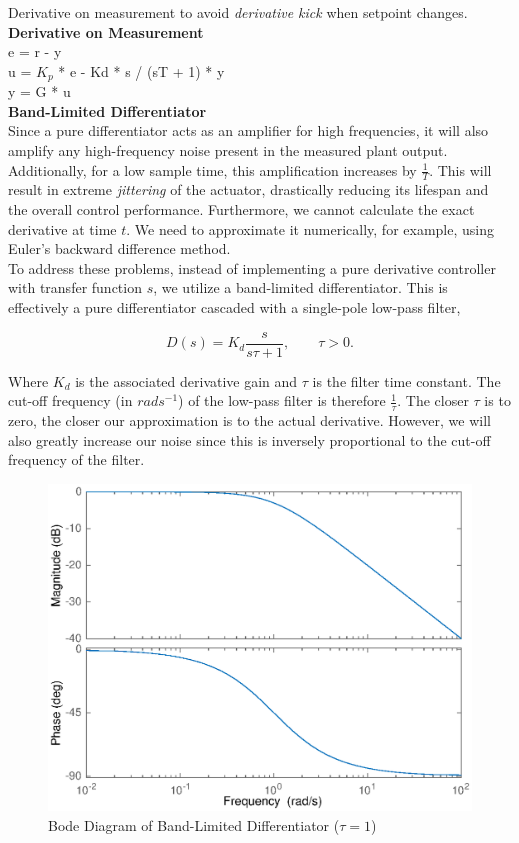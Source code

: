 \documentclass[a4paper]{article}
\begin{document}
Derivative on measurement to avoid \textit{derivative kick} when setpoint changes. \\

\textbf{Derivative on Measurement} \\
e = r - y \\
u = $K_p$ * e - Kd * s / (sT + 1) * y \\
y = G * u \\

\textbf{Band-Limited Differentiator} \\
Since a pure differentiator acts as an amplifier for high frequencies, it will also amplify any high-frequency noise present in the measured plant output. Additionally, for a low sample time, this amplification increases by $\frac{1}{T}$. This will result in extreme \textit{jittering} of the actuator, drastically reducing its lifespan and the overall control performance. Furthermore, we cannot calculate the exact derivative at time $t$. We need to approximate it numerically, for example, using Euler's backward difference method. \\
To address these problems, instead of implementing a pure derivative controller with transfer function $s$, we utilize a band-limited differentiator. This is effectively a pure differentiator cascaded with a single-pole low-pass filter,

\begin{equation}
D(s) = K_d \frac{s}{s \tau + 1}, \qquad \tau > 0.
\end{equation}

Where $K_d$ is the associated derivative gain and $\tau$ is the filter time constant. The cut-off frequency (in $rads^{-1}$) of the low-pass filter is therefore $\frac{1}{\tau}$. The closer $\tau$ is to zero, the closer our approximation is to the actual derivative. However, we will also greatly increase our noise since this is inversely proportional to the cut-off frequency of the filter.

\begin{figure}[H]	\includegraphics[scale=0.7]{BodeBandlimitedDiff}
\centering
\caption{Bode Diagram of Band-Limited Differentiator ($\tau = 1$)}
\end{figure}
\end{document}
